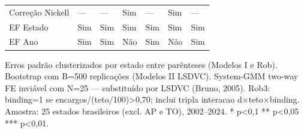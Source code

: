 \begin{table}[!h]
{\begin{threeparttable}
\begin{tabular}[t]{lllllll}
Correção Nickell & — & — & Sim & — & Sim & —\\
EF Estado & Sim & Sim & Sim & Sim & Sim & Sim\\
EF Ano & Sim & Sim & Não & Sim & Não & Sim\\
\bottomrule
\end{tabular}
\begin{tablenotes}[para]
\item Erros padrão clusterizados por estado entre parênteses (Modelos I e Rob). Bootstrap com B=500 replicações (Modelos II LSDVC). System-GMM two-way FE inviável com N=25 — substituído por LSDVC (Bruno, 2005). Rob3: binding=1 se encargos/(teto/100)>0,70; inclui tripla interacao d×teto×binding. Amostra: 25 estados brasileiros (excl. AP e TO), 2002–2024. * p<0,1  ** p<0,05  *** p<0,01.
\end{tablenotes}
\end{threeparttable}}
\end{table}
